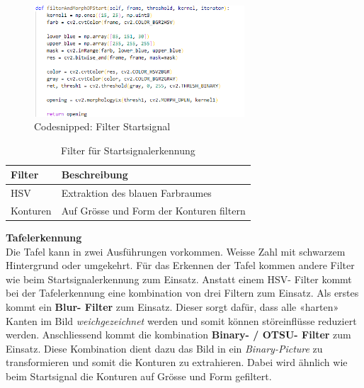 \documentclass[../../main.tex]{subfiles}
\begin{document}
\vspace{0.5cm}

\begin{figure}[H] %
  \centering
  \includegraphics[width=0.7\textwidth]{codesnipped-filterStart.png}
  \caption{Codesnipped: Filter Startsignal}
  \label{fig:codesnipped_startfilter}
\end{figure}

\vspace{1cm}

\begin{table}[H] %
  \begin{flushleft}
      \begin{tabular}{ | p{3cm} | p{10.5cm} |}
          \hline
          \textbf{Filter}  & \textbf{Beschreibung} \\\hline
          HSV          & Extraktion des blauen Farbraumes \\\hline
          Konturen     & Auf Grösse und Form der Konturen filtern\\\hline
      \end{tabular}
  \end{flushleft}
  \caption{Filter für Startsignalerkennung}
  \label{tab:filter_startsignal}
\end{table}

\newpage

\textbf{Tafelerkennung}\\
Die Tafel kann in zwei Ausführungen vorkommen. Weisse Zahl mit schwarzem Hintergrund oder umgekehrt. Für das Erkennen der Tafel kommen andere Filter wie beim Startsignalerkennung zum Einsatz. Anstatt einem HSV- Filter kommt bei der Tafelerkennung eine kombination von drei Filtern zum Einsatz. Als erstes kommt ein \textbf{Blur- Filter} zum Einsatz. Dieser sorgt dafür, dass alle «harten» Kanten im Bild \textit{weichgezeichnet} werden und somit können störeinflüsse reduziert werden. Anschliessend kommt die kombination \textbf{Binary- / OTSU- Filter} zum Einsatz. Diese Kombination dient dazu das Bild in ein \textit{Binary-Picture} zu transformieren und somit die Konturen zu extrahieren. Dabei wird ähnlich wie beim Startsignal die Konturen auf Grösse und Form gefiltert. 
\end{document}
